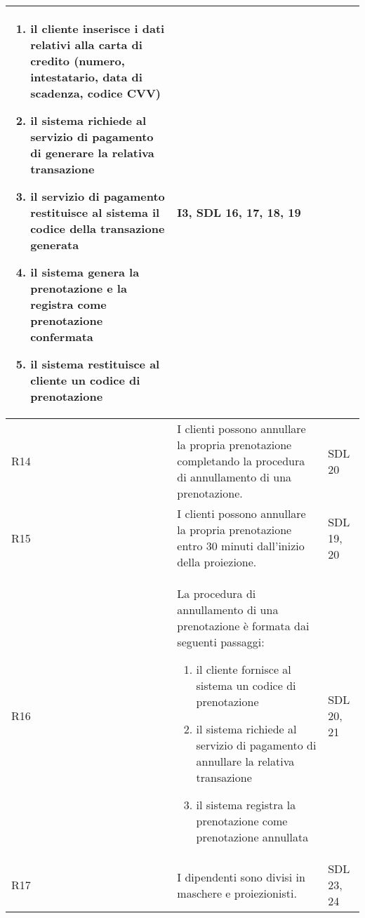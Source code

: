 \begin{longtable}{|p{0.8cm}|p{13.4cm}|p{2.1cm}|}
\begin{enumerate}
            \item il cliente inserisce i dati relativi alla carta
                  di credito (numero, intestatario, data di scadenza,
                  codice CVV)
            \item il sistema richiede al servizio di pagamento di
                  generare la relativa transazione
            \item il servizio di pagamento restituisce al sistema
                  il codice della transazione generata
            \item il sistema genera la prenotazione e la registra
                  come prenotazione confermata
            \item il sistema restituisce al cliente un codice di
                  prenotazione
      \end{enumerate}                   &
      I3, SDL 16, 17, 18, 19
      \\\hline
      R14                                                                     &
      I clienti possono annullare la propria prenotazione completando la
      procedura di annullamento di una prenotazione.                          &
      SDL 20
      \\\hline
      R15                                                                     &
      I clienti possono annullare la propria prenotazione entro 30 minuti
      dall'inizio della proiezione.                                           &
      SDL 19, 20
      \\\hline
      R16                                                                     &
      La procedura di annullamento di una prenotazione è formata dai
      seguenti passaggi:
      \begin{enumerate}
            \item il cliente fornisce al sistema un codice di
                  prenotazione
            \item il sistema richiede al servizio di pagamento di
                  annullare la relativa transazione
            \item il sistema registra la prenotazione come prenotazione
                  annullata
      \end{enumerate}             &
      SDL 20, 21
      \\\hline
      R17                                                                     &
      I dipendenti sono divisi in maschere e proiezionisti.                   &
      SDL 23, 24
      \\\hline

\end{longtable}
